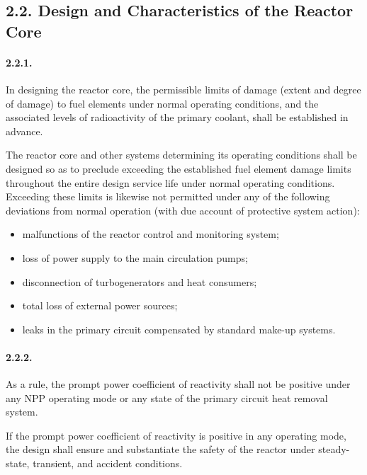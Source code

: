 \documentclass[openright]{bookest}
\begin{document}
\subsection*{2.2. Design and Characteristics of the Reactor Core}

\paragraph{2.2.1.}
In designing the reactor core, the permissible limits of damage (extent and degree of damage) to fuel elements under normal operating conditions, and the associated levels of radioactivity of the primary coolant, shall be established in advance.

The reactor core and other systems determining its operating conditions shall be designed so as to preclude exceeding the established fuel element damage limits throughout the entire design service life under normal operating conditions.  
Exceeding these limits is likewise not permitted under any of the following deviations from normal operation (with due account of protective system action):

\begin{itemize}
    \item malfunctions of the reactor control and monitoring system;
    \item loss of power supply to the main circulation pumps;
    \item disconnection of turbogenerators and heat consumers;
    \item total loss of external power sources;
    \item leaks in the primary circuit compensated by standard make-up systems.
\end{itemize}

\paragraph{2.2.2.}
As a rule, the prompt power coefficient of reactivity shall not be positive under any NPP operating mode or any state of the primary circuit heat removal system.

If the prompt power coefficient of reactivity is positive in any operating mode, the design shall ensure and substantiate the safety of the reactor under steady-state, transient, and accident conditions.
\end{document}
